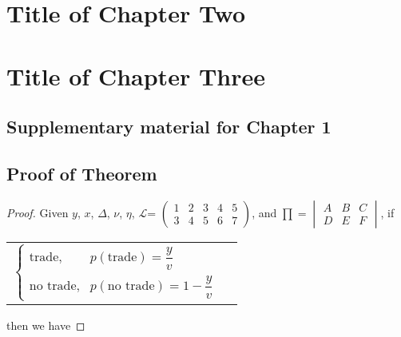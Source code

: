 \documentclass[letterpaper]{report}
\begin{document}
\chapter{Title of Chapter Two}


\chapter{Title of Chapter Three}


\onehalfspacing


\begin{appendices}
  \doublespacing
  
  \chapter{Supplementary material for  Chapter 1}
  
  \section{Proof of Theorem}
  
  \begin{proof} 
    
    Given $y$, $x$, $\Delta$, $\nu$, $\eta$, $\mathcal{L}$=
    $\begin{pmatrix}
    1 & 2 & 3 & 4 & 5 \\
    3 & 4 & 5 & 6 & 7
    \end{pmatrix}$,
    and $\prod=\begin{vmatrix}
    A &B  &C \\
    D&  E& F
    \end{vmatrix}$, if
    
    \begin{center}
      \begin{tabular}{ll}
        $\begin{cases}
        \text{trade}, & p(\text{trade})=\dfrac{y}{v}\\
        \text{no trade}, & p(\text{no trade})=1-\dfrac{y}{v}
        \end{cases}$
      \end{tabular}
    \end{center}
    then we have
    

\end{proof}
\end{appendices}
\end{document}

